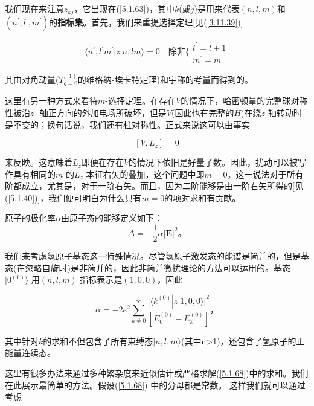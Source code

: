 ﻿\documentclass[UTF8,twoside]{ctexart}
\begin{document}
我们现在来注意$z_{kj}$，它出现在(\ref{5.1.63})，其中$k$(或$j$)是用来代表$(n,l,m)$和$(n^{\prime} ,l^{\prime} ,m^{\prime})$的\textbf{指标集}。首先，我们来重提选择定理[见(\ref{3.11.39})]

\begin{equation} \label{5.1.65}
\langle n^{\prime},l^{\prime}m^{\prime}|z|n,lm\rangle=0 \quad \text{除非} \Big\{\begin{array}{l}
l^{\prime}=l\pm 1 \\
m^{\prime}=m
\end{array}
\end{equation}

\noindent 其由对角动量($T_{q=0}^{(1)}$的维格纳-埃卡特定理)和宇称的考量而得到的。

这里有另一种方式来看待$m$-选择定理。在存在$V$的情况下，哈密顿量的完整球对称性被沿$z$- 轴正方向的外加电场所破坏，但是$V$(因此也有完整的$H$)在绕$z$-轴转动时是不变的；换句话说，我们还有柱对称性。正式来说这可以由事实

\begin{equation} \label{5.1.66}
[V,L_z]=0
\end{equation}

\noindent 来反映。这意味着$L_z$即便在存在$V$的情况下依旧是好量子数。因此，扰动可以被写作具有相同的$m$ 的$L_z$ 本征右矢的叠加，这个问题中即$m=0$。这一说法对于所有阶都成立，尤其是，对于一阶右矢。而且，因为二阶能移是由一阶右矢所得的[见(\ref{5.1.40})]，我们便可明白为什么只有$m=0$的项对求和有贡献。

原子的极化率$\alpha$由原子态的能移定义如下：
\begin{equation} \label{5.1.67}
\Delta=-\dfrac{1}{2}\alpha|{\boldsymbol{E}}|^2\text{。}
\end{equation}

\noindent 我们来考虑氢原子基态这一特殊情况。尽管氢原子激发态的能谱是简并的，但是基态(在忽略自旋时)是非简并的，因此非简并微扰理论的方法可以运用的。基态$|0^{(0)}\rangle$ 用$(n,l,m)$ 指标表示是$(1,0,0)$，因此

\begin{equation} \label{5.1.68}
\alpha=-2e^2\displaystyle\sum_{k\neq0}^{\infty}\dfrac{|\langle k^{(0)}|z|1,0,0\rangle|^2}{\left[E_0^{(0)}-E_k^{(0)}\right]}\text{，}
\end{equation}

\noindent  其中针对$k$的求和不但包含了所有束缚态$|n,l,m\rangle$(其中n>1)，还包含了氢原子的正能量连续态。

这里有很多办法来通过多种繁杂度来近似估计或严格求解(\ref{5.1.68})中的求和。我们在此展示最简单的方法。假设(\ref{5.1.68}) 中的分母都是常数。 这样我们就可以通过考虑
\end{document}
